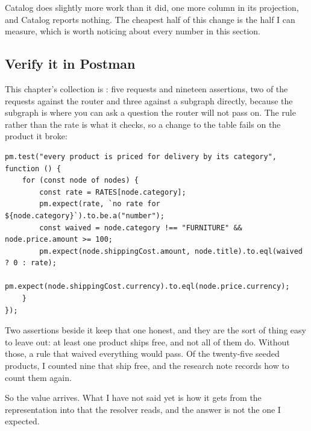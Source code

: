 Catalog does slightly more work than it did, one more column in its projection,
and Catalog reports nothing. The cheapest half of this change is the half I can
measure, which is worth noticing about every number in this section.

\subsection*{Verify it in Postman}

%
This chapter's collection is : five requests and nineteen
assertions, two of the requests against the router and three against a subgraph
directly, because the subgraph is where you can ask a question the router will
not pass on. The rule rather than the rate is what it checks, so a change to
the table fails on the product it broke:

\begin{verbatim}
pm.test("every product is priced for delivery by its category", function () {
    for (const node of nodes) {
        const rate = RATES[node.category];
        pm.expect(rate, `no rate for ${node.category}`).to.be.a("number");
        const waived = node.category !== "FURNITURE" && node.price.amount >= 100;
        pm.expect(node.shippingCost.amount, node.title).to.eql(waived ? 0 : rate);
        pm.expect(node.shippingCost.currency).to.eql(node.price.currency);
    }
});
\end{verbatim}

Two assertions beside it keep that one honest, and they are the sort of thing
easy to leave out: at least one product ships free, and not all of them do.
Without those, a rule that waived everything would pass. Of the twenty-five
seeded products, I counted nine that ship free, and the research note records
how to count them again.

\medskip
So the value arrives. What I have not said yet is how it gets from the
representation into that  the resolver reads, and the
answer is not the one I expected.

%
